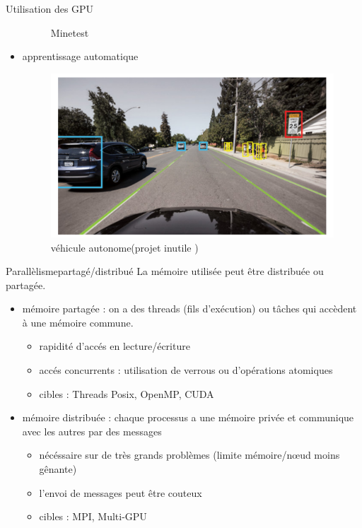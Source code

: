 \documentclass[11pt,mathserif]{beamer}
\newcommand{\argi}{\faLightbulbO}
\newcommand{\kontuz}{\faExclamationTriangle}
\newcommand{\pozik}{\faSmileO}
\newcommand{\triste}{\faFrownO}
\newcommand{\adibi}{\faCommentO}
\begin{document}
\begin{frame}{Utilisation des GPU}
\begin{itemize}[<+->]
\begin{minipage}[r]{0.49\linewidth}
\begin{figure}
          \caption{\tiny Minetest}
        \end{figure}
      \end{minipage}
    \item[\adibi]  \begin{minipage}[l]{0.49\linewidth}
     apprentissage automatique
      \end{minipage}
      \begin{minipage}[r]{0.49\linewidth}
        \begin{figure}
        \includegraphics[width=0.6\linewidth]{fig/neural.png}
          \caption{\tiny véhicule autonome(projet inutile \faMehO)}
        \end{figure}
      \end{minipage}
  \end{itemize}
\end{frame}

\begin{frame}{Parallèlisme}{partagé/distribué}
\pause
La mémoire utilisée peut être distribuée ou partagée.
  \begin{itemize}[<+->]
    \item mémoire partagée : on a des threads (fils d'exécution) ou tâches qui accèdent à une mémoire commune. 
      \begin{itemize}
        \item[\pozik] rapidité d'accés en lecture/écriture
        \item[\kontuz] accés concurrents : utilisation de verrous ou d'opérations atomiques
        \item[\argi] cibles : Threads Posix, OpenMP, CUDA
      \end{itemize}
    \item mémoire distribuée : chaque processus a une mémoire privée et communique avec les autres par des messages
      \begin{itemize}
        \item[\argi] nécéssaire sur de très grands problèmes (limite mémoire/nœud moins gênante)
        \item[\triste] l'envoi de messages peut être couteux
        \item[\argi] cibles : MPI, Multi-GPU
      \end{itemize}
  \end{itemize}
\end{frame}
\end{document}
